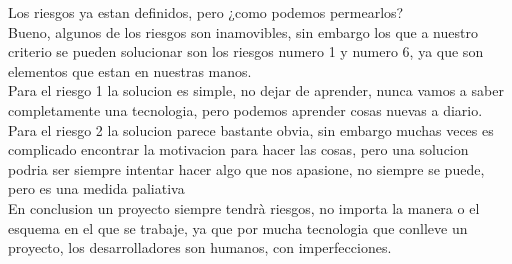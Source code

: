 \documentclass{article}
\begin{document}
Los riesgos ya estan definidos, pero ¿como podemos permearlos? \\

Bueno, algunos de los riesgos son inamovibles, sin embargo los que a nuestro criterio se pueden solucionar son los riesgos numero 1 y numero 6, ya que son elementos que estan en nuestras manos. \\
Para el riesgo 1 la solucion es simple, no dejar de aprender, nunca vamos a saber completamente una tecnologia, pero podemos aprender cosas nuevas a diario.\\
Para el riesgo 2 la solucion parece bastante obvia, sin embargo muchas veces es complicado encontrar la motivacion para hacer las cosas, pero una solucion podria ser siempre intentar hacer algo que nos apasione, no siempre se puede, pero es una medida paliativa\\

En conclusion un proyecto siempre tendrà riesgos, no importa la manera o el esquema en el que se trabaje, ya que por mucha tecnologia que conlleve un proyecto, los desarrolladores son humanos, con imperfecciones.
\end{document}
